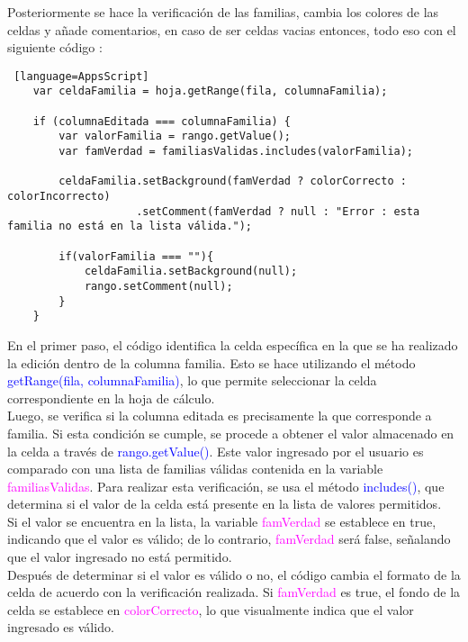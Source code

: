 \documentclass[12pt]{article} %
\begin{document}
    Posteriormente se hace la verificación de las familias, cambia los colores de las celdas y añade comentarios, en caso de ser celdas vacias entonces, todo eso con el siguiente código : \\
    
    \begin{lstlisting} [language=AppsScript]
    var celdaFamilia = hoja.getRange(fila, columnaFamilia);
    
    if (columnaEditada === columnaFamilia) {
        var valorFamilia = rango.getValue();
        var famVerdad = familiasValidas.includes(valorFamilia);
        
        celdaFamilia.setBackground(famVerdad ? colorCorrecto : colorIncorrecto)
                    .setComment(famVerdad ? null : "Error : esta familia no está en la lista válida.");
    
        if(valorFamilia === ""){
            celdaFamilia.setBackground(null);
            rango.setComment(null);
        }
    }
    \end{lstlisting}

    En el primer paso, el código identifica la celda específica en la que se ha realizado la edición dentro de la columna familia. Esto se hace utilizando el método \textcolor{blue}{getRange(fila, columnaFamilia)}, lo que permite seleccionar la celda correspondiente en la hoja de cálculo. \\
    
    Luego, se verifica si la columna editada es precisamente la que corresponde a familia. Si esta condición se cumple, se procede a obtener el valor almacenado en la celda a través de \textcolor{blue}{rango.getValue()}. Este valor ingresado por el usuario es comparado con una lista de familias válidas contenida en la variable \textcolor{magenta}{familiasValidas}. Para realizar esta verificación, se usa el método \textcolor{blue}{includes()}, que determina si el valor de la celda está presente en la lista de valores permitidos. \\
    
    Si el valor se encuentra en la lista, la variable \textcolor{magenta}{famVerdad} se establece en true, indicando que el valor es válido; de lo contrario, \textcolor{magenta}{famVerdad} será false, señalando que el valor ingresado no está permitido. \\

    Después de determinar si el valor es válido o no, el código cambia el formato de la celda de acuerdo con la verificación realizada. Si \textcolor{magenta}{famVerdad} es true, el fondo de la celda se establece en \textcolor{magenta}{colorCorrecto}, lo que visualmente indica que el valor ingresado es válido. \\
    
\end{document}
